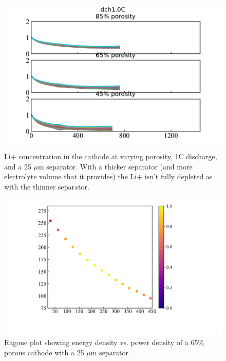 \documentclass{elsarticle}
\begin{document}
\begin{figure}
    \centering
    \includegraphics[width=\textwidth]{Figures/C_Lip_25um_dch1.0C.pdf}
    \caption{Li+ concentration in the cathode at varying porosity, 1C discharge, and a 25 $\mu$m separator. With a thicker separator (and more electrolyte volume that it provides) the Li+ isn't fully depleted as with the thinner separator.}
    \label{fig:Liconc25umsep}
\end{figure}

\begin{figure}
    \centering
    \includegraphics[width=\textwidth]{Figures/Ragone_65pct25um.pdf}
    \caption{Ragone plot showing energy density vs. power density of a 65\% porous cathode with a 25 $\mu$m separator}
    \label{fig:ragone25umsep}
\end{figure}
\end{document}
